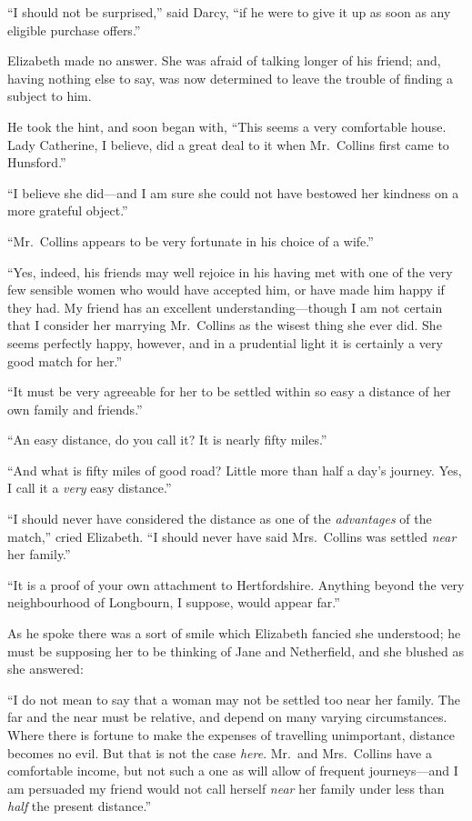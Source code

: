 \documentclass[12pt,english]{book}
\begin{document}
{}``I should not be surprised,'' said Darcy, {}``if he were to
give it up as soon as any eligible purchase offers.''

Elizabeth made no answer. She was afraid of talking longer of his
friend; and, having nothing else to say, was now determined to leave
the trouble of finding a subject to him.

He took the hint, and soon began with, {}``This seems a very comfortable
house. Lady Catherine, I believe, did a great deal to it when Mr.\ Collins
first came to Hunsford.''

{}``I believe she did\mbox{---}and I am sure she could not have
bestowed her kindness on a more grateful object.''

{}``Mr.\ Collins appears to be very fortunate in his choice of a
wife.''

{}``Yes, indeed, his friends may well rejoice in his having met with
one of the very few sensible women who would have accepted him, or
have made him happy if they had. My friend has an excellent understanding\mbox{---}though
I am not certain that I consider her marrying Mr.\ Collins as the
wisest thing she ever did. She seems perfectly happy, however, and
in a prudential light it is certainly a very good match for her.''

{}``It must be very agreeable for her to be settled within so easy
a distance of her own family and friends.''

{}``An easy distance, do you call it? It is nearly fifty miles.''

{}``And what is fifty miles of good road? Little more than half a
day's journey. Yes, I call it a \textit{very} easy distance.''

{}``I should never have considered the distance as one of the \textit{advantages}
of the match,'' cried Elizabeth. {}``I should never have said Mrs.\ Collins
was settled \textit{near} her family.''

{}``It is a proof of your own attachment to Hertfordshire. Anything
beyond the very neighbourhood of Longbourn, I suppose, would appear
far.''

As he spoke there was a sort of smile which Elizabeth fancied she
understood; he must be supposing her to be thinking of Jane and Netherfield,
and she blushed as she answered:

{}``I do not mean to say that a woman may not be settled too near
her family. The far and the near must be relative, and depend on many
varying circumstances. Where there is fortune to make the expenses
of travelling unimportant, distance becomes no evil. But that is not
the case \textit{here}. Mr.\ and Mrs.\ Collins have a comfortable
income, but not such a one as will allow of frequent journeys\mbox{---}and
I am persuaded my friend would not call herself \textit{near} her
family under less than \textit{half} the present distance.''
\end{document}
